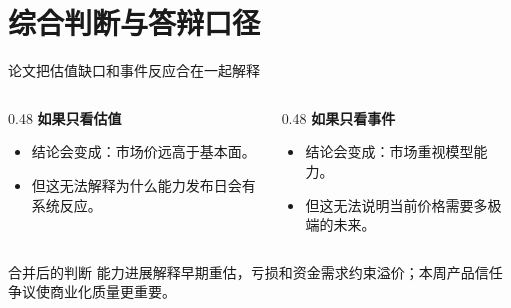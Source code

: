 \documentclass[aspectratio=169,11pt]{beamer}
\begin{document}
\section{综合判断与答辩口径}

\begin{frame}{论文把估值缺口和事件反应合在一起解释}
  \begin{columns}[T,onlytextwidth]
    \begin{column}{0.48\textwidth}
      \textbf{如果只看估值}
      \begin{itemize}
        \item 结论会变成：市场价远高于基本面。
        \item 但这无法解释为什么能力发布日会有系统反应。
      \end{itemize}
    \end{column}
    \begin{column}{0.48\textwidth}
      \textbf{如果只看事件}
      \begin{itemize}
        \item 结论会变成：市场重视模型能力。
        \item 但这无法说明当前价格需要多极端的未来。
      \end{itemize}
    \end{column}
  \end{columns}
  \vspace{0.5em}
  \begin{block}{合并后的判断}
    能力进展解释早期重估，亏损和资金需求约束溢价；本周产品信任争议使商业化质量更重要。
  \end{block}
\end{frame}
\end{document}

